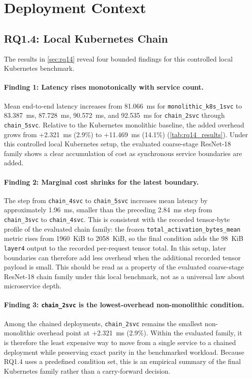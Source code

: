 \section{Deployment Context}
\label{sec:analysis-deployment}

\subsection{RQ1.4: Local Kubernetes Chain}
\label{sec:analysis-rq14}

The results in \cref{sec:rq14} reveal four bounded findings for this controlled
local Kubernetes benchmark.

\paragraph{Finding 1: Latency rises monotonically with service count.}
Mean end-to-end latency increases from 81.066~ms for
\texttt{monolithic\_k8s\_1svc} to 83.387~ms, 87.728~ms, 90.572~ms, and
92.535~ms for \texttt{chain\_2svc} through \texttt{chain\_5svc}. Relative to
the Kubernetes monolithic baseline, the added overhead grows from
+2.321~ms (2.9\%) to +11.469~ms (14.1\%) (\cref{tab:rq14_results}). Under
this controlled local Kubernetes setup, the evaluated coarse-stage ResNet-18
family shows a clear accumulation of cost as synchronous service boundaries
are added.

\paragraph{Finding 2: Marginal cost shrinks for the latest boundary.}
The step from \texttt{chain\_4svc} to \texttt{chain\_5svc} increases mean
latency by approximately 1.96~ms, smaller than the preceding 2.84~ms step
from \texttt{chain\_3svc} to \texttt{chain\_4svc}. This is consistent with the
recorded tensor-byte profile of the evaluated chain family: the frozen
\texttt{total\_activation\_bytes\_mean} metric rises from 1960~KiB to
2058~KiB, so the final condition adds the 98~KiB \texttt{layer4} output to the
recorded per-request tensor total. In this setup, later boundaries can
therefore add less overhead when the additional recorded tensor payload is
small. This should be read as a property of the evaluated coarse-stage
ResNet-18 chain family under this local benchmark, not as a universal law about
microservice depth.

\paragraph{Finding 3: \texttt{chain\_2svc} is the lowest-overhead non-monolithic condition.}
Among the chained deployments, \texttt{chain\_2svc} remains the smallest
non-monolithic overhead point at +2.321~ms (2.9\%). Within the evaluated
family, it is therefore the least expensive way to move from a single service
to a chained deployment while preserving exact parity in the benchmarked
workload. Because RQ1.4 uses a predefined condition set, this is an empirical
summary of the final Kubernetes family rather than a carry-forward decision.

